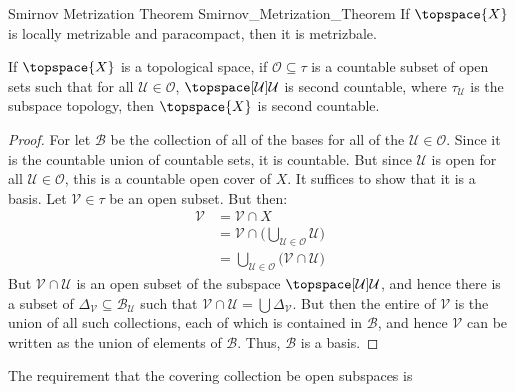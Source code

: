 \documentclass{article}                                                        %
\begin{document}
        \begin{ftheorem}{Smirnov Metrization Theorem}
                        {Smirnov_Metrization_Theorem}
            If $\topspace{X}$ is locally metrizable and paracompact, then it is
            metrizbale.
        \end{ftheorem}
        \begin{theorem}
            \label{thm:Count_Open_Cover_of_Sec_Count_Implies_Sec_Count}%
            If $\topspace{X}$ is a topological space, if
            $\mathcal{O}\subseteq\tau$ is a countable subset of open sets such
            that for all $\mathcal{U}\in\mathcal{O}$,
            $\topspace[\mathcal{U}]{\mathcal{U}}$ is second countable, where
            $\tau_{\mathcal{U}}$ is the subspace topology, then $\topspace{X}$
            is second countable.
        \end{theorem}
        \begin{proof}
            For let $\mathcal{B}$ be the collection of all of the bases for all
            of the $\mathcal{U}\in\mathcal{O}$. Since it is the countable union
            of countable sets, it is countable. But since $\mathcal{U}$ is open
            for all $\mathcal{U}\in\mathcal{O}$, this is a countable open cover
            of $X$. It suffices to show that it is a basis. Let
            $\mathcal{V}\in\tau$ be an open subset. But then:
            \begin{align}
                \mathcal{V}&=\mathcal{V}\cap{X}\\
                &=\mathcal{V}\cap\Big(
                    \bigcup_{\mathcal{U}\in\mathcal{O}}\mathcal{U}
                \Big)\\
                &=\bigcup_{\mathcal{U}\in\mathcal{O}}
                    \big(\mathcal{V}\cap\mathcal{U}\big)
            \end{align}
            But $\mathcal{V}\cap\mathcal{U}$ is an open subset of the subspace
            $\topspace[\mathcal{U}]{\mathcal{U}}$, and hence there is a subset
            of $\Delta_{\mathcal{V}}\subseteq\mathcal{B}_{\mathcal{U}}$ such
            that $\mathcal{V}\cap\mathcal{U}=\bigcup\Delta_{\mathcal{V}}$. But
            then the entire of $\mathcal{V}$ is the union of all such
            collections, each of which is contained in $\mathcal{B}$, and hence
            $\mathcal{V}$ can be written as the union of elements of
            $\mathcal{B}$. Thus, $\mathcal{B}$ is a basis.
        \end{proof}
        The requirement that the covering collection be open subspaces is
\end{document}
